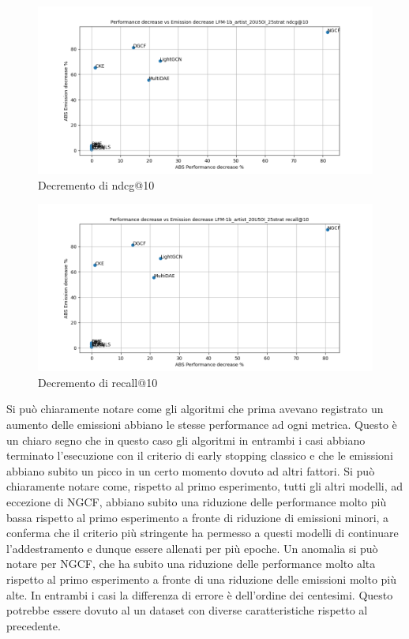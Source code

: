 \begin{figure}[H]
    \centering
    \includegraphics[scale=0.5]{images/decrement_ndcg@10_LFM-1b_artist_20U50I_25strat.png}
    \caption{Decremento di ndcg@10}
\end{figure}

\begin{figure}[H]
    \centering
    \includegraphics[scale=0.5]{images/decrement_recall@10_LFM-1b_artist_20U50I_25strat.png}
    \caption{Decremento di recall@10}
\end{figure}


\noindent Si può chiaramente notare come gli algoritmi che prima avevano registrato un aumento delle emissioni abbiano le stesse performance ad ogni metrica.
Questo è un chiaro segno che in questo caso gli algoritmi in entrambi i casi abbiano terminato l'esecuzione con il criterio di early stopping classico e che le emissioni abbiano subito un picco in un certo momento dovuto ad altri fattori.
Si può chiaramente notare come, rispetto al primo esperimento, tutti gli altri modelli, ad eccezione di NGCF, abbiano subito una riduzione delle performance molto più bassa rispetto al primo esperimento a fronte di riduzione di emissioni minori, a conferma che il criterio più stringente ha permesso a questi modelli di continuare l'addestramento e dunque essere allenati per più epoche.
Un anomalia si può notare per NGCF, che ha subito una riduzione delle performance molto alta rispetto al primo esperimento a fronte di una riduzione delle emissioni molto più alte. In entrambi i casi la differenza di errore è dell'ordine dei centesimi. Questo potrebbe essere dovuto al un dataset con diverse caratteristiche rispetto al precedente.

